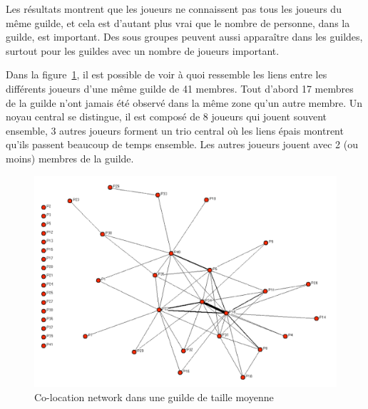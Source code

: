 \documentclass[10pt,twocolumn]{article}
\begin{document}
\par Les résultats montrent que les joueurs ne connaissent pas tous les joueurs du même guilde, et cela est d'autant plus vrai que le nombre de personne, dans la guilde, est important. Des sous groupes peuvent aussi apparaître dans les guildes, surtout pour les guildes avec un nombre de joueurs important. 
\par Dans la figure~\ref{co-location}, il est possible de voir à quoi ressemble les liens entre les différents joueurs d'une même guilde de 41 membres. Tout d'abord 17 membres de la guilde n'ont jamais été observé dans la même zone qu'un autre membre. Un noyau central se distingue, il est composé de 8 joueurs qui jouent souvent ensemble, 3 autres joueurs forment un trio central où les liens épais montrent qu'ils passent beaucoup de temps ensemble. Les autres joueurs jouent avec 2 (ou moins) membres de la guilde.
	 \begin{figure}[!h]
        \centering
        \includegraphics[scale=0.85]{./images/co-location.png}
        \caption{Co-location network dans une guilde de taille moyenne}
        \label{co-location}
        \end{figure}

\end{document}
